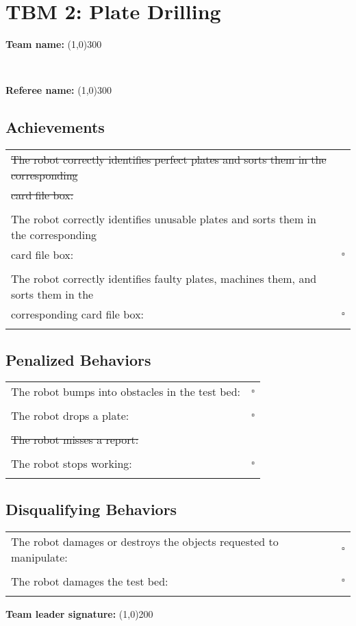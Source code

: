 \section*{TBM 2: Plate Drilling}
\vspace{0.5cm} \begin{large} \textbf{Team name:} \line(1,0){300} \end{large} \vspace{0.7cm} \\ 
\vspace{0.5cm} \begin{large} \textbf{Referee name:} \line(1,0){300} \end{large} \vspace{0.2cm}

\subsection*{Achievements}
\begin{tabular}{ l c}
\st{The robot correctly identifies perfect plates and sorts them in the corresponding} &  \\
\st{card file box:} &  \\ \\

The robot correctly identifies unusable plates and sorts them in the corresponding &  \\
card file box: & $\square$ \\ \\

The robot correctly identifies faulty plates, machines them, and sorts them in the &  \\
corresponding card file box: & $\square$ \\ \\
\end{tabular}

\subsection*{Penalized Behaviors}
\begin{tabular}{ l c}
The robot bumps into obstacles in the test bed: & $\square$ \\ \\
The robot drops a plate: & $\square$ \\ \\
\st{The robot misses a report:} & \\ \\
The robot stops working: & $\square$ \\ \\
\end{tabular}

\subsection*{Disqualifying Behaviors}
\begin{tabular}{ l c}
The robot damages or destroys the objects requested to manipulate: & $\square$ \\ \\
The robot damages the test bed: & $\square$ \\ \\
\end{tabular}

\vspace{1.5cm}
\begin{large}
\textbf{Team leader signature:}
\line(1,0){200}
\end{large}